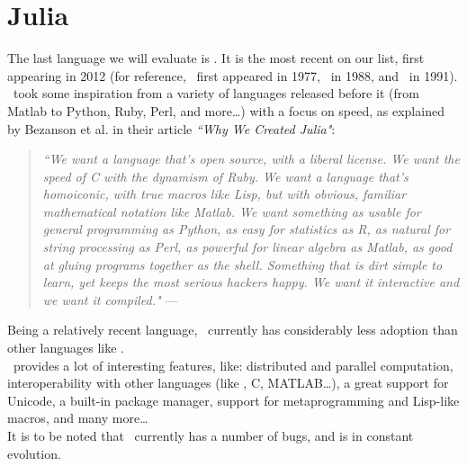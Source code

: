 
\renewcommand{\currentPart}{Julia} 

\newpage
\part{Julia} \label{Julia}

The last language we will evaluate is \julia. It is the most recent on our list, first appearing in 2012 (for reference, \awk\ first appeared in 1977, \perl\ in 1988, and \python\ in 1991). \\

\julia\ took some inspiration from a variety of languages released before it (from Matlab to Python, Ruby, Perl, and more\dots) with a focus on speed, as explained by Bezanson et al. in their article \emph{``Why We Created Julia"}:

\begin{quote}
	\emph{``We want a language that's open source, with a liberal license. We want the speed of C with the dynamism of Ruby. We want a language that's homoiconic, with true macros like Lisp, but with obvious, familiar mathematical notation like Matlab. We want something as usable for general programming as Python, as easy for statistics as R, as natural for string processing as Perl, as powerful for linear algebra as Matlab, as good at gluing programs together as the shell. Something that is dirt simple to learn, yet keeps the most serious hackers happy. We want it interactive and we want it compiled."} --- \cite{julia-manifesto}
\end{quote} 

\bigskip
\bigskip

Being a relatively recent language, \julia\ currently has considerably less adoption than other languages like \python.
\\

\julia\ provides a lot of interesting features, like: 
distributed and parallel computation,
interoperability with other languages (like \python, C, MATLAB\dots),
a great support for Unicode,
a built-in package manager,
support for metaprogramming and Lisp-like macros, and many more\dots\ 
\citep{features-of-julia} \citep{julia-features} \citep{julia-awesome-features}
\\

It is to be noted that \julia\ currently has a number of bugs, and is in constant evolution. 
\citep{is-julia-right-for-you} \\


